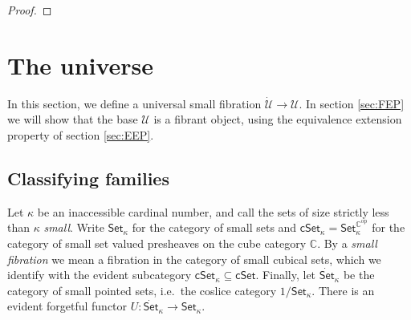 \documentclass[12pt]{article}
\newcommand{\C}{\ensuremath{\mathbb{C}}}
\newcommand{\Set}{\ensuremath{\mathsf{Set}}}
\newcommand{\cSet}{\ensuremath{\mathsf{cSet}}}
\newcommand{\ra}{\ensuremath{\rightarrow}}
\newcommand{\I}{\ensuremath{\mathrm{I}}}
\newcommand{\U}{\ensuremath{\mathcal{U}}}
\theoremstyle{remark}
\theoremstyle{definition}
\begin{document}
\begin{proof}
%
\end{proof}

\section{The universe}\label{sec:U}

In this section, we define a universal small fibration $\dot{\U}\ra \U$.  
In section \ref{sec:FEP} we will show that the base $\U$ is a fibrant object, using the equivalence extension property of section \ref{sec:EEP}.

\subsection{Classifying families}

Let $\kappa$ be an inaccessible cardinal number, and call the sets of size strictly less than $\kappa$ \emph{small}.  Write $\Set_\kappa$ for the category of small sets and $\cSet_\kappa = \Set_\kappa^{\C^{\mathrm{op}}}$ for the category of small set valued presheaves on the cube category $\C$.  By a \emph{small fibration} we mean a fibration in the category of small cubical sets, which we identify with the evident subcategory $\cSet_\kappa \subseteq \cSet$.  Finally, let $\dot{\Set}_\kappa$ be the category of small pointed sets, i.e.\ the coslice category $1/\Set_\kappa$.  There is an evident forgetful functor  $U:\dot{\Set}_\kappa \ra {\Set}_\kappa$.
\end{document}
